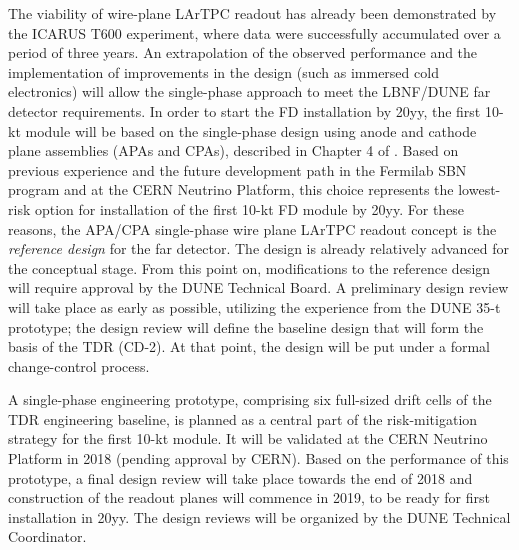 The viability of wire-plane LArTPC readout has already been demonstrated by the ICARUS T600 
experiment, where data were successfully accumulated over a period of three years. 
An extrapolation of the observed performance and the implementation of improvements 
in the design (such as immersed cold electronics) will allow the single-phase 
approach to meet the LBNF/DUNE far detector requirements. In order to start the FD installation
by 20yy, %
the first 10-kt module will be based on the single-phase design using anode and cathode
plane assemblies (APAs and CPAs), described in Chapter 4 of \voldune. 
Based on previous experience and the 
future development path in the Fermilab SBN program and at the CERN Neutrino Platform, 
this choice represents the lowest-risk option for installation of the first 10-kt FD module by 
20yy. %
For these reasons, the APA/CPA single-phase wire plane LArTPC readout 
concept %
is the \textit{reference design} 
for the far detector. 
The design is already relatively advanced for the conceptual  
stage. From this point on, modifications to the reference design will require approval
by the DUNE Technical Board. A preliminary design review will take place as early 
as possible, utilizing the experience from the DUNE 35-t prototype; the design 
review will define the baseline design that will form the basis of the TDR (CD-2). 
At that point, the design will be put under a formal change-control 
process. 

A single-phase engineering prototype,
comprising six full-sized drift cells of the TDR engineering baseline,
is planned as a central part of the risk-mitigation 
strategy for the first 10-kt module. It
will be validated at the CERN Neutrino Platform in 2018 (pending approval by CERN). 
%
Based on the  performance of this prototype, %
a final design review will take place towards the end of 2018 and construction of the readout planes will 
commence in 2019, to be ready for first installation in 20yy. %
The design reviews will be organized by the DUNE Technical Coordinator. 

